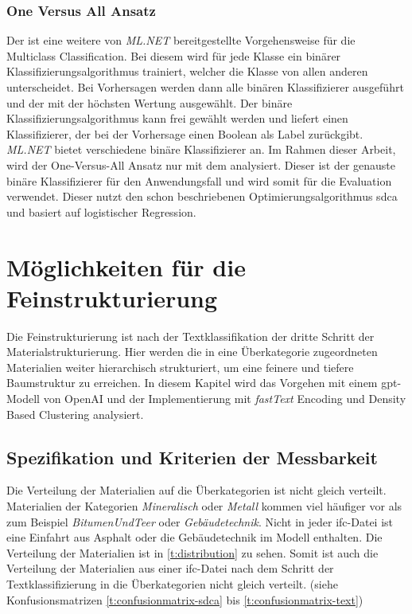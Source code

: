 \subsubsection{One Versus All Ansatz}
\label{c:conception:classification:multiclass:onevsall}
Der  ist eine weitere von \textit{ML.NET} bereitgestellte Vorgehensweise für die Multiclass Classification. Bei diesem wird für jede Klasse ein binärer Klassifizierungsalgorithmus trainiert, welcher die Klasse von allen anderen unterscheidet. Bei Vorhersagen werden dann alle binären Klassifizierer ausgeführt und der mit der höchsten Wertung ausgewählt. Der binäre Klassifizierungsalgorithmus kann frei gewählt werden und liefert einen Klassifizierer, der bei der Vorhersage einen Boolean als Label zurückgibt. \citep[vgl.][]{oneversusall_doc} \textit{ML.NET} bietet verschiedene binäre Klassifizierer an. Im Rahmen dieser Arbeit, wird der One-Versus-All Ansatz nur mit dem  analysiert. Dieser ist der genauste binäre Klassifizierer für den Anwendungsfall und wird somit für die Evaluation verwendet. Dieser nutzt den schon beschriebenen Optimierungsalgorithmus \ac{sdca} und basiert auf logistischer Regression. \citep[vgl.][]{scdabinary_doc}

\section{Möglichkeiten für die Feinstrukturierung}
\label{c:conception:fine-structuring}
Die Feinstrukturierung ist nach der Textklassifikation der dritte Schritt der Materialstrukturierung. Hier werden die in eine Überkategorie zugeordneten Materialien weiter hierarchisch strukturiert, um eine feinere und tiefere Baumstruktur zu erreichen. In diesem Kapitel wird das Vorgehen mit einem \ac{gpt}-Modell von OpenAI und der Implementierung mit \textit{fastText} Encoding und Density Based Clustering analysiert.

\subsection{Spezifikation und Kriterien der Messbarkeit}
\label{c:conception:fine-structuring:criteria}
Die Verteilung der Materialien auf die Überkategorien ist nicht gleich verteilt. Materialien der Kategorien \textit{Mineralisch} oder \textit{Metall} kommen viel häufiger vor als zum Beispiel \textit{BitumenUndTeer} oder \textit{Gebäudetechnik}. Nicht in jeder \ac{ifc}-Datei ist eine Einfahrt aus Asphalt oder die Gebäudetechnik im Modell enthalten. Die Verteilung der Materialien ist in \autoref{t:distribution} zu sehen. Somit ist auch die Verteilung der Materialien aus einer \ac{ifc}-Datei nach dem Schritt der Textklassifizierung in die Überkategorien nicht gleich verteilt. (siehe Konfusionsmatrizen \ref{t:confusionmatrix-sdca} bis \ref{t:confusionmatrix-text})

